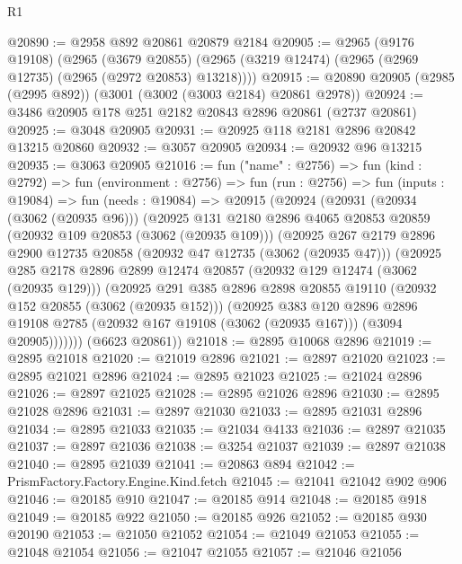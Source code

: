 \begin{lexlean}{R1}
\begin{coremodule}
@20890 := @2958 @892 @20861 @20879 @2184
@20905 := @2965
    (@9176 @19108)
    (@2965
      (@3679 @20855)
      (@2965 (@3219 @12474) (@2965 (@2969 @12735) (@2965 (@2972 @20853) @13218))))
@20915 := @20890 @20905 (@2985 (@2995 @892)) (@3001 (@3002 (@3003 @2184) @20861 @2978))
@20924 := @3486 @20905 @178 @251 @2182 @20843 @2896 @20861 (@2737 @20861)
@20925 := @3048 @20905
@20931 := @20925 @118 @2181 @2896 @20842 @13215 @20860
@20932 := @3057 @20905
@20934 := @20932 @96 @13215
@20935 := @3063 @20905
@21016 := fun ("name" : @2756) =>
  fun (kind : @2792) =>
  fun (environment : @2756) =>
  fun (run : @2756) =>
  fun (inputs : @19084) =>
  fun (needs : @19084) =>
  @20915
    (@20924
      (@20931
        (@20934 (@3062 (@20935 @96)))
        (@20925
          @131
          @2180
          @2896
          @4065
          @20853
          @20859
          (@20932 @109 @20853 (@3062 (@20935 @109)))
          (@20925
            @267
            @2179
            @2896
            @2900
            @12735
            @20858
            (@20932 @47 @12735 (@3062 (@20935 @47)))
            (@20925
              @285
              @2178
              @2896
              @2899
              @12474
              @20857
              (@20932 @129 @12474 (@3062 (@20935 @129)))
              (@20925
                @291
                @385
                @2896
                @2898
                @20855
                @19110
                (@20932 @152 @20855 (@3062 (@20935 @152)))
                (@20925
                  @383
                  @120
                  @2896
                  @2896
                  @19108
                  @2785
                  (@20932 @167 @19108 (@3062 (@20935 @167)))
                  (@3094 @20905)))))))
      (@6623 @20861))
@21018 := @2895 @10068 @2896
@21019 := @2895 @21018
@21020 := @21019 @2896
@21021 := @2897 @21020
@21023 := @2895 @21021 @2896
@21024 := @2895 @21023
@21025 := @21024 @2896
@21026 := @2897 @21025
@21028 := @2895 @21026 @2896
@21030 := @2895 @21028 @2896
@21031 := @2897 @21030
@21033 := @2895 @21031 @2896
@21034 := @2895 @21033
@21035 := @21034 @4133
@21036 := @2897 @21035
@21037 := @2897 @21036
@21038 := @3254 @21037
@21039 := @2897 @21038
@21040 := @2895 @21039
@21041 := @20863 @894
@21042 := PrismFactory.Factory.Engine.Kind.fetch
@21045 := @21041 @21042 @902 @906
@21046 := @20185 @910
@21047 := @20185 @914
@21048 := @20185 @918
@21049 := @20185 @922
@21050 := @20185 @926
@21052 := @20185 @930 @20190
@21053 := @21050 @21052
@21054 := @21049 @21053
@21055 := @21048 @21054
@21056 := @21047 @21055
@21057 := @21046 @21056

\end{coremodule}
\end{lexlean}
